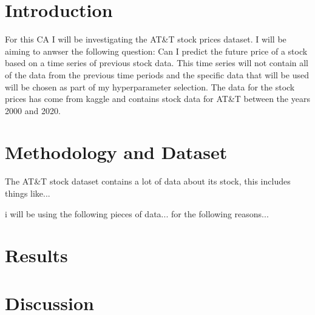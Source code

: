 \documentclass{report}
\begin{document}
\section{Introduction}
For this CA I will be investigating the AT&T stock prices dataset.
I will be aiming to anwser the following question: Can I predict the future price of a stock based on a time series of previous stock data.
This time series will not contain all of the data from the previous time periods and the specific data that will be used will be chosen as part of my hyperparameter selection.
The data for the stock prices has come from kaggle and contains stock data for AT&T between the years 2000 and 2020.

\section{Methodology and Dataset}
The AT&T stock dataset contains a lot of data about its stock, this includes things like...

i will be using the following pieces of data...
for the following reasons...

\section{Results}

\section{Discussion}
\end{document}
